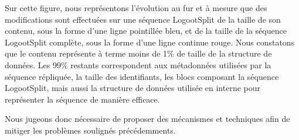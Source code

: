 Sur cette figure, nous représentons l'évolution au fur et à mesure que des modifications sont effectuées sur une séquence LogootSplit de la taille de son contenu, sous la forme d'une ligne pointillée bleu, et de la taille de la séquence LogootSplit complète, sous la forme d'une ligne continue rouge.
Nous constatons que le contenu représente à terme moins de 1\% de taille de la structure de données.
Les 99\% restants correspondent aux métadonnées utilisées par la séquence répliquée, \ie la taille des identifiants, les blocs composant la séquence LogootSplit, mais aussi la structure de données utilisée en interne pour représenter la séquence de manière efficace.

Nous jugeons donc nécessaire de proposer des mécanismes et techniques afin de mitiger les problèmes soulignés précédemments.

